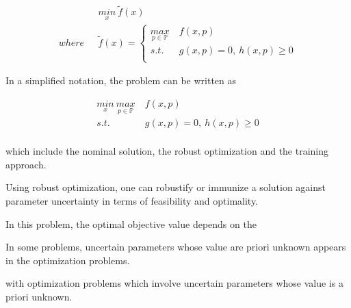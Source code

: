 \begin{equation}
	\begin{aligned}
		\  \  \ &  \underset{x}{min} \  \tilde f(x) \\
		where  \  \  \ & \tilde f(x) =    \begin{cases}
		  	\underset{p \in \mathbb{P}}{max} & \ f(x,p) \\
			s.t.   & \  g(x, p) = 0, \  h(x,p)  \geq  0 \\
		\end{cases}  
	\end{aligned}
\end{equation}

In a simplified notation, the problem can be written as 

\begin{equation}
	\begin{aligned}
		\underset{x}{min} \   \underset{p \in \mathbb{P}}{max} & \  f(x,p) \\ 
		s.t.  & \  g(x, p) = 0, \  h(x,p)  \geq  0 \\
	\end{aligned}
\end{equation}






which include the nominal solution, the robust optimization and the training approach. 


Using robust optimization, one can robustify or immunize a solution against parameter uncertainty in terms
of feasibility and optimality.






In this problem, the optimal objective value depends on the 







In some problems, uncertain parameters whose value are priori unknown appears in the optimization problems. 



with optimization problems which involve uncertain parameters whose value is a priori unknown. 

